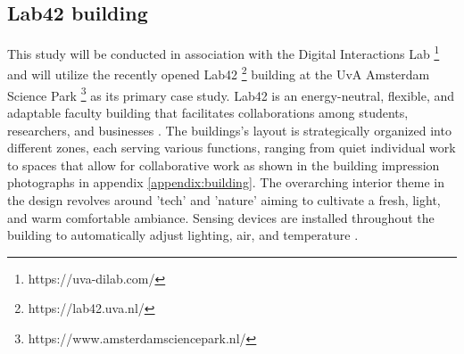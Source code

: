 \subsection{Lab42 building}

This study will be conducted in association with the Digital Interactions Lab \footnote{https://uva-dilab.com/} and will utilize the recently opened Lab42 \footnote{https://lab42.uva.nl/} building at the UvA Amsterdam Science Park \footnote{https://www.amsterdamsciencepark.nl/} as its primary case study. Lab42 is an energy-neutral, flexible, and adaptable faculty building that facilitates collaborations among students, researchers, and businesses \cite{crouwel}. The buildings's layout is strategically organized into different zones, each serving various functions, ranging from quiet individual work to spaces that allow for collaborative work as shown in the building impression photographs in appendix \ref{appendix:building}. The overarching interior theme in the design revolves around 'tech' and 'nature' aiming to cultivate a fresh, light, and warm comfortable ambiance. Sensing devices are installed throughout the building to automatically adjust lighting, air, and temperature \cite{faculty}.
